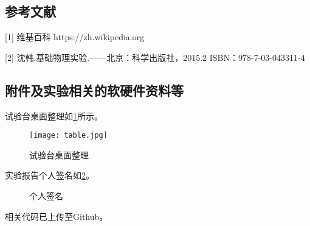\documentclass[dvipsnames, svgnames,a4paper,11pt]{article}
\begin{document}
	\subsection{参考文献}
	[1] 维基百科 https://zh.wikipedia.org
	
	[2] 沈韩.基础物理实验.——北京：科学出版社，2015.2 ISBN：978-7-03-043311-4
	
	
	\subsection{附件及实验相关的软硬件资料等}
	试验台桌面整理如\cref{fig:table}所示。

		\begin{figure}[htbp]
			\centering
			\texttt{[image: table.jpg]}
			\caption{试验台桌面整理}
			\label{fig:table}
		\end{figure}
	
	实验报告个人签名如\cref{fig:name}。
	
	\begin{figure}[htbp]
		\centering
		\caption{个人签名}
		\label{fig:name}			
	\end{figure}
	
	
	相关代码已上传至Github。
	
	
	
\end{document}
